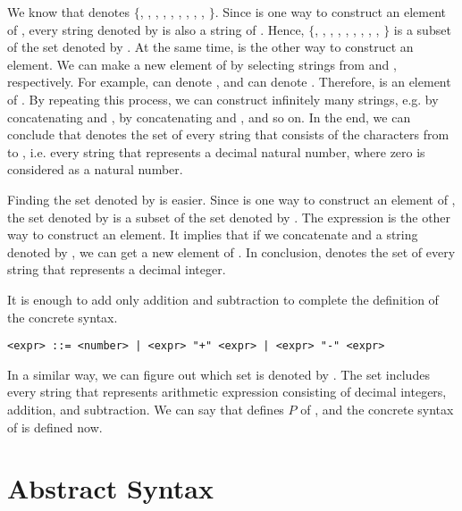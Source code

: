 We know that  denotes
$\{$, , , , ,
, , , , $\}$.
Since  is one way to construct an element of , every
string denoted by  is also a string of . Hence,
$\{$, , , , ,
, , , , $\}$
is a subset of the set denoted by . At the same time, 
 is the other way to construct an element. We can make a new element
of  by selecting strings from  and ,
respectively. For example,  can denote , and
 can denote . Therefore,  is an element of
. By repeating this process, we can construct infinitely many
strings, e.g.  by concatenating  and ,
 by concatenating  and , and so on. In the
end, we can conclude that  denotes the set of every string that
consists of the characters from  to , i.e. every string that
represents a decimal natural number, where zero is considered as a
natural number.

Finding the set denoted by  is easier. Since  is one
way to construct an element of , the set denoted by 
is a subset of the set denoted by . The expression   is
the other way to construct an element. It implies that if we concatenate
 and a string denoted by , we can get a new element of
. In conclusion,  denotes the set of every string
that represents a decimal integer.

It is enough to add only addition and subtraction to complete the definition of
the concrete syntax.

\begin{verbatim}
<expr> ::= <number> | <expr> "+" <expr> | <expr> "-" <expr>
\end{verbatim}

In a similar way, we can figure out which set is denoted by . The
set includes every string that represents arithmetic expression consisting of
decimal integers, addition, and subtraction. We can say that 
defines $P$ of \Lang, and the concrete syntax of \Lang is defined now.

\section{Abstract Syntax}

